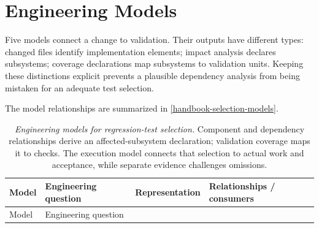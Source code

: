 \section{Engineering Models}\label{heading:engineering-models}

Five models connect a change to validation. Their outputs have different types: changed files identify implementation elements; impact analysis declares subsystems; coverage declarations map subsystems to validation units. Keeping these distinctions explicit prevents a plausible dependency analysis from being mistaken for an adequate test selection.

The model relationships are summarized in \autoref{handbook-selection-models}.

{\footnotesize
\begin{longtable}[]{@{}
  >{\raggedright\arraybackslash}p{}
  >{\raggedright\arraybackslash}p{}
  >{\raggedright\arraybackslash}p{}
  >{\raggedright\arraybackslash}p{}@{}}
\caption[Engineering models for regression-test selection]{\emph{Engineering models for regression-test selection.} Component and dependency relationships derive an affected-subsystem declaration; validation coverage maps it to checks. The execution model connects that selection to actual work and acceptance, while separate evidence challenges omissions.}\label{handbook-selection-models}\tabularnewline
\toprule\noalign{}
\begin{minipage}[b]{\linewidth}\raggedright
Model
\end{minipage} & \begin{minipage}[b]{\linewidth}\raggedright
Engineering question
\end{minipage} & \begin{minipage}[b]{\linewidth}\raggedright
Representation
\end{minipage} & \begin{minipage}[b]{\linewidth}\raggedright
Relationships / consumers
\end{minipage} \\
\midrule\noalign{}
\endfirsthead
\toprule\noalign{}
\begin{minipage}[b]{\linewidth}\raggedright
Model
\end{minipage} & \begin{minipage}[b]{\linewidth}\raggedright
Engineering question
\end{minipage} & \begin{minipage}[b]{\linewidth}\raggedright

\end{minipage}
\end{longtable}}
